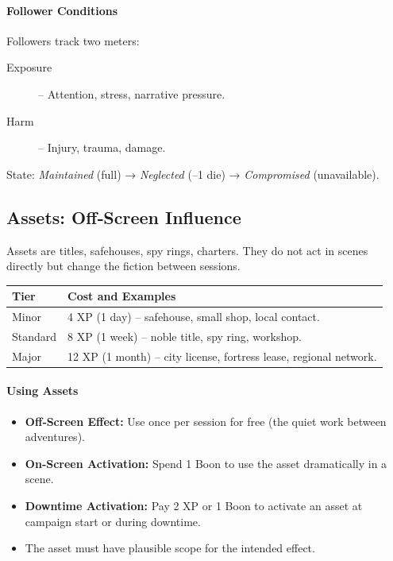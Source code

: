 \paragraph{Follower Conditions}
Followers track two meters:
\begin{description}
  \item[Exposure] – Attention, stress, narrative pressure.
  \item[Harm] – Injury, trauma, damage.
\end{description}
State: \textit{Maintained} (full) → \textit{Neglected} (–1 die) → \textit{Compromised} (unavailable).

\subsection{Assets: Off‑Screen Influence}
\label{subsec:assets-gm}

Assets are titles, safehouses, spy rings, charters. They do not act in scenes directly but change the fiction between sessions.

\begin{tcolorbox}[title=Asset Tiers, colback=white!97!gray, colframe=black!80!gray]
\begin{tabularx}{\textwidth}{lX}
\toprule
\textbf{Tier} & \textbf{Cost and Examples} \\
\midrule
Minor & 4 XP (1 day) – safehouse, small shop, local contact. \\
Standard & 8 XP (1 week) – noble title, spy ring, workshop. \\
Major & 12 XP (1 month) – city license, fortress lease, regional network. \\
\bottomrule
\end{tabularx}
\end{tcolorbox}

\paragraph{Using Assets}
\begin{itemize}
  \item \textbf{Off‑Screen Effect:} Use once per session for free (the quiet work between adventures).
  \item \textbf{On‑Screen Activation:} Spend 1 Boon to use the asset dramatically in a scene.
  \item \textbf{Downtime Activation:} Pay 2 XP or 1 Boon to activate an asset at campaign start or during downtime.
  \item The asset must have plausible scope for the intended effect.
\end{itemize}


